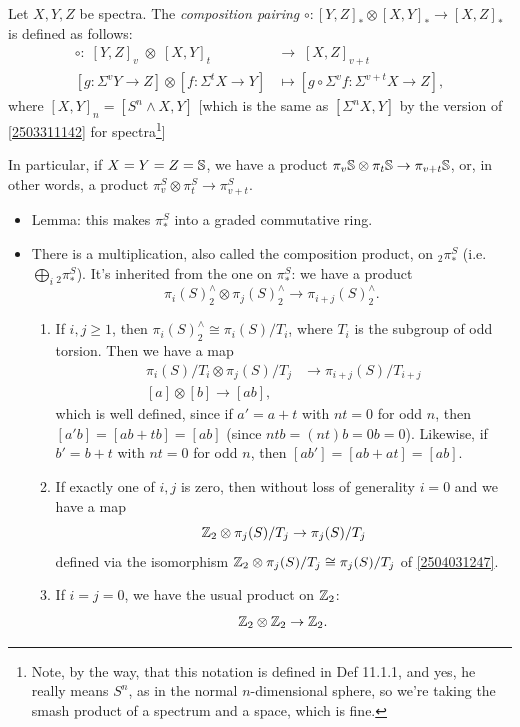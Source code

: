 \documentclass{MetricNotes2023}
\def\bb{\ensuremath\mathbb}
\def\inte{\ensuremath\mathbb{Z}}
\begin{document}
\begin{definition}
Let \(X, Y, Z\) be spectra. The \textit{composition pairing} \(\circ : [Y, Z]_* \otimes [X,Y]_* \to [X,Z]_*\) is defined as follows: 
\begin{align*}
\circ :\; [Y, Z]_v\; \otimes \;[X,Y]_t\; &\to\; [X,Z]_{v+t}\\
[g : \Sigma^v Y \to Z]\otimes [f : \Sigma^t X\to Y] &\mapsto [g \circ \Sigma^v f : \Sigma^{v+t}X\to Z],
\end{align*}
where \([X,Y]_n=[S^n\wedge X, Y]\) [which is the same as \([\Sigma^n X, Y]\) by the version of \ref{2503311142} for spectra\footnote{Note, by the way, that this notation is defined in \autocite{rognes2} Def 11.1.1, and yes, he really means \(S^n\), as in the normal \(n\)-dimensional sphere, so we're taking the smash product of a spectrum and a space, which is fine.}]
\end{definition}

In particular, if \(X=Y=Z=\bb{S}\), we have a product \(\pi_v \bb{S}\otimes \pi_t \bb{S}\to \pi_{v+t}\bb{S}\), or, in other words, a product \(\pi_v^S\otimes \pi_t^S\to \pi_{v+t}^S\). 

\begin{itemize}
\item Lemma: this makes \(\pi_*^S\) into a graded commutative ring.

\item There is a multiplication, also called the composition product, on \(\text{}_2\pi_*^S\) (i.e. \(\bigoplus_i \text{}_2\pi_*^S\)). It's inherited from the one on \(\pi_*^S\): we have a product
\[\pi_i(S)^\wedge_2 \otimes \pi_j(S)^\wedge_2 \to \pi_{i+j}(S)^\wedge_2.\]
\begin{enumerate}
\item If \(i, j \geq 1\), then \(\pi_i(S)^\wedge_2 \cong \pi_i(S)/T_i\), where \(T_i\) is the subgroup of odd torsion. Then we have a map
\begin{align*}
\pi_i(S)/T_i \otimes \pi_j(S)/T_j &\to \pi_{i+j}(S)/T_{i+j}\\
[a]\otimes[b] \to [ab],
\end{align*}
which is well defined, since if \(a'=a+t\) with \(nt=0\) for odd \(n\), then \([a'b]=[ab+tb]=[ab]\) (since \(ntb=(nt)b=0b=0\)). Likewise, if \(b'=b+t\) with \(nt=0\) for odd \(n\), then \([ab']=[ab+at]=[ab]\).
\item If exactly one of \(i, j\) is zero, then without loss of generality \(i=0\) and we have a map
\[\inte_2 \otimes \pi_j(S)/T_j \to \pi_{j}(S)/T_{j}\]
defined via the isomorphism \(\inte_2 \otimes \pi_j(S)/T_j \cong \pi_{j}(S)/T_{j}\) of \ref{2504031247}. 
\item If \(i=j=0\), we have the usual product on \(\inte_2\):
\[\inte_2 \otimes \inte_2 \to \inte_2.\]
\end{enumerate}
\end{itemize}
\end{document}
